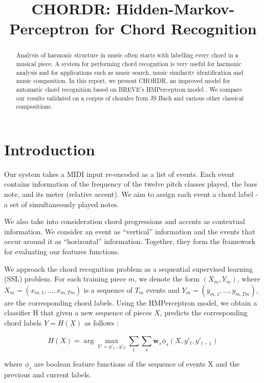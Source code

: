 \documentclass{article} %
\title{CHORDR: Hidden-Markov-Perceptron for Chord Recognition}
\begin{document}
\maketitle

\begin{abstract}
Analysis of harmonic structure in music often starts with labelling every chord in a musical piece. A system for performing chord recognition is very useful for harmonic analysis and for applications such as music search, music similarity identification and music composition. In this report, we present CHORDR, an improved model for automatic chord recognition based on BREVE’s HMPerceptron model \cite{breve}. We compare our results validated on a corpus of chorales from JS Bach and various other classical compositions.
\end{abstract}

\section{Introduction}

Our system takes a MIDI input re-encoded as a list of events. Each event contains information of the frequency of the twelve pitch classes played, the bass note, and its meter (relative accent). We aim to assign each event a chord label - a set of simultaneously played notes.

We also take into consideration chord progressions and accents as contextual information. We consider an event as “vertical” information and the events that occur around it as “horizontal” information. Together, they form the framework for evaluating our features functions.

We approach the chord recognition problem as a sequential supervised learning (SSL) problem. For each training piece $m$, we denote the form $(X_m, Y_m)$, where $X_m = (x_{m,1},\ldots,x_{m,Tm})$ is a sequence of $T_m$ events and $Y_m = (y_{m,1},\ldots,y_{m,Tm})$, are the corresponding chord labels. Using the HMPerceptron model, we obtain a classifier H that given a new sequence of pieces $X$, predicts the corresponding chord labels $Y=H(X)$ as follows \cite{breve}:

\begin{equation}
  H(X) = \arg\max_{Y'={y'_1\ldots y'_T}}\sum_t^{}\sum_s^{}\mathbf{w}_s\phi_s(X,y'_t,y'_{t-1})
\end{equation}

where $\phi_s$ are boolean feature functions of the sequence of events X and the previous and current labels.
\end{document}

